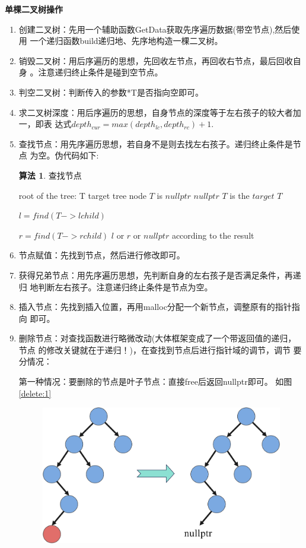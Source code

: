 \documentclass[supercite]{Experimental_Report}
\theoremstyle{definition}
\newtheorem{alg}{算法}[section]
\begin{document}
	\noindent \textbf{单棵二叉树操作}
	\begin{enumerate}
		\item 创建二叉树：先用一个辅助函数GetData获取先序遍历数据(带空节点),然后使用
		一个递归函数build递归地、先序地构造一棵二叉树。
		\item 销毁二叉树：用后序遍历的思想，先回收左节点，再回收右节点，最后回收自身
		。注意递归终止条件是碰到空节点。
		\item 判空二叉树：判断传入的参数*T是否指向空即可。
		\item 
		求二叉树深度：用后序遍历的思想，自身节点的深度等于左右孩子的较大者加一，即表
		达式$depth_{cur} = max(depth_{lc},depth_{rc}) + 1$.
		\item 查找节点：用先序遍历思想，若自身不是则去找左右孩子。递归终止条件是节点
		为空。伪代码如下:
		\begin{shaded*}\begin{alg}{查找节点}
				\begin{algorithmic}
					\Input root of the tree: T
					\Output target tree node
					\If $T$ is $nullptr$
					\State \Return $nullptr$
					\EndIf
					\If $T$ is the $target$
					\State \Return $T$
					\EndIf\par
					$l = find(T->lchild)$\par
					$r = find(T->rchild)$
					\State \Return $l$ or $r$ or $nullptr$ according to the 
					result
					\EndProcedure
				\end{algorithmic}
		\end{alg}\end{shaded*}
		\item 节点赋值：先找到节点，然后进行修改即可。
		\item 获得兄弟节点：用先序遍历思想，先判断自身的左右孩子是否满足条件，再递归
		地判断左右孩子。注意递归终止条件是节点为空。
		\item 插入节点：先找到插入位置，再用malloc分配一个新节点，调整原有的指针指向
		即可。
		\item 删除节点：对查找函数进行略微改动(大体框架变成了一个带返回值的递归，节点
		的修改关键就在于递归！)，在查找到节点后进行指针域的调节，调节
		要分情况：\par
		第一种情况：要删除的节点是叶子节点：直接free后返回nullptr即可。
		如图\ref{delete:1}
		\begin{figure}[H]
			\centering
			\includegraphics[scale=0.7]{images/二叉树删除节点1.png}

\end{figure}
\end{enumerate}
\end{document}
